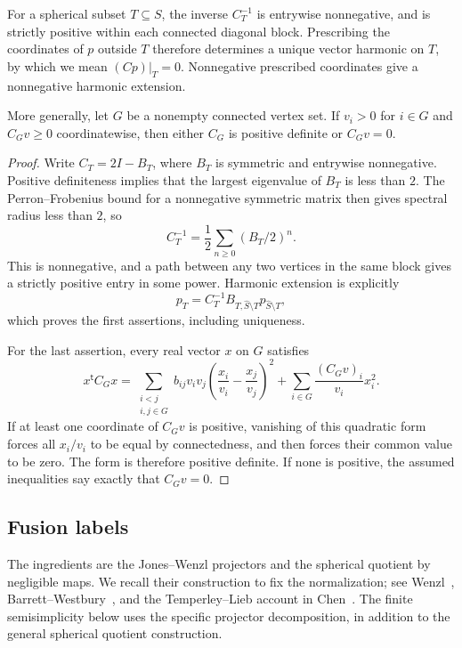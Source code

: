 \begin{lemma}
\label{lem:cartan-positive-null}
For a spherical subset $T\subseteq S$, the inverse $C_T^{-1}$ is
entrywise nonnegative, and is strictly positive within each connected
diagonal block. Prescribing the coordinates of $p$ outside $T$ therefore
determines a unique vector harmonic on $T$, by which we mean
$(Cp)|_T=0$. Nonnegative prescribed coordinates give a nonnegative
harmonic extension.

More generally, let $G$ be a nonempty connected vertex set. If
$v_i>0$ for $i\in G$ and $C_Gv\geq0$ coordinatewise, then either
$C_G$ is positive definite or $C_Gv=0$.
\end{lemma}

\begin{proof}
Write $C_T=2I-B_T$, where $B_T$ is symmetric and entrywise nonnegative.
Positive definiteness implies that the largest eigenvalue of $B_T$ is
less than $2$. The Perron--Frobenius bound for a nonnegative symmetric
matrix then gives spectral radius less than $2$, so
\[
 C_T^{-1}=\frac12\sum_{n\geq0}(B_T/2)^n.
\]
This is nonnegative, and a path between any two vertices in the same
block gives a strictly positive entry in some power. Harmonic extension
is explicitly
\[
 p_T=C_T^{-1}B_{T,\widehat S\setminus T}
                 p_{\widehat S\setminus T},
\]
which proves the first assertions, including uniqueness.

For the last assertion, every real vector $x$ on $G$ satisfies
\begin{equation}
 x^{\mathsf t}C_Gx
 =\sum_{\substack{i<j\\i,j\in G}}b_{ij}v_iv_j
       \left(\frac{x_i}{v_i}-\frac{x_j}{v_j}\right)^2
   +\sum_{i\in G}\frac{(C_Gv)_i}{v_i}x_i^2.
 \label{eq:category-scaled-form}
\end{equation}
If at least one coordinate of $C_Gv$ is positive, vanishing of this
quadratic form forces all $x_i/v_i$ to be equal by connectedness, and
then forces their common value to be zero. The form is therefore
positive definite. If none is positive, the assumed inequalities say
exactly that $C_Gv=0$.
\end{proof}

\subsection{Fusion labels}

The ingredients are the Jones--Wenzl projectors and the spherical
quotient by negligible maps.  We recall their construction to fix the
normalization; see Wenzl~\cite{Wenzl1987},
Barrett--Westbury~\cite[Theorem~2.9]{BarrettWestbury1999}, and the
Temperley--Lieb account in Chen~\cite[Sections~5.1--5.4]{Chen2014}.
The finite semisimplicity below uses the specific projector decomposition,
in addition to the general spherical quotient construction.

